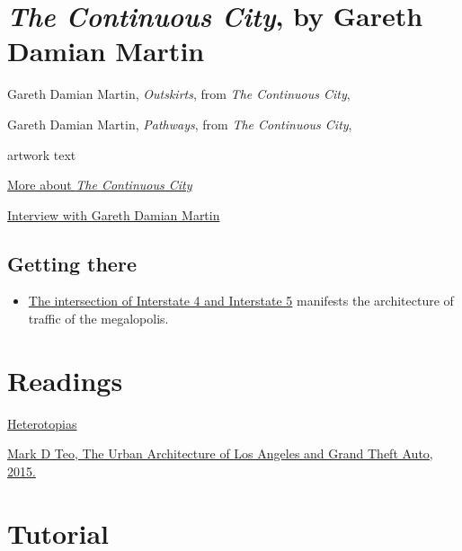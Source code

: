 \documentclass[
  openany]{book}
\providecommand{\tightlist}{%
  \setlength{\itemsep}{0pt}\setlength{\parskip}{0pt}}
\begin{document}
\hypertarget{the-continuous-city-by-gareth-damian-martin}{%
\section*{\texorpdfstring{\emph{The Continuous City}, by Gareth Damian Martin}{The Continuous City, by Gareth Damian Martin}}\label{the-continuous-city-by-gareth-damian-martin}}

Gareth Damian Martin, \emph{Outskirts}, from \emph{The Continuous City},

Gareth Damian Martin, \emph{Pathways}, from \emph{The Continuous City},

artwork text

\href{https://socks-studio.com/2019/10/13/gareth-damian-martin-postcards-from-the-continuous-city-2018/}{More about \emph{The Continuous City}}

\href{https://www.gamescenes.org/2018/04/interview-gareth-damian-martin-the-aesthetics-of-analogue-game-photography.html}{Interview with Gareth Damian Martin}

\hypertarget{getting-there}{%
\subsection*{Getting there}\label{getting-there}}

\begin{itemize}
\tightlist
\item
  \href{https://grandtheftdata.com/landmarks/\#951.507,-1144.265,4,atlas,name=trainyard_warehouse,Trainyard_Warehouse,_East_Los_Santos}{The intersection of Interstate 4 and Interstate 5} manifests the architecture of traffic of the megalopolis.
\end{itemize}

\hypertarget{readings}{%
\section*{Readings}\label{readings}}

\href{https://www.heterotopiaszine.com/}{Heterotopias}

\href{https://www.academia.edu/18173221/The_Urban_Architecture_of_Los_Angeles_and_Grand_Theft_Auto}{Mark D Teo, The Urban Architecture of Los Angeles and Grand Theft Auto, 2015.}

\hypertarget{tutorial}{%
\section*{Tutorial}\label{tutorial}}
\end{document}
